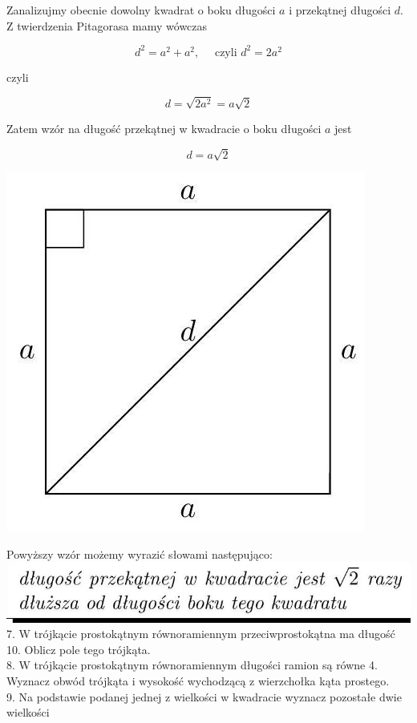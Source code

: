 \documentclass[10pt]{article}
\begin{document}
Zanalizujmy obecnie dowolny kwadrat o boku długości \(a\) i przekątnej długości \(d\). Z twierdzenia Pitagorasa mamy wówczas

\[
d^{2}=a^{2}+a^{2}, \quad \text { czyli } d^{2}=2 a^{2}
\]

czyli

\[
d=\sqrt{2 a^{2}}=a \sqrt{2}
\]

Zatem wzór na długość przekątnej w kwadracie o boku długości \(a\) jest

\[
d=a \sqrt{2}
\]

\begin{center}
\includegraphics[max width=\textwidth]{2024_11_21_71f62bd117d375398909g-124}
\end{center}

Powyższy wzór możemy wyrazić słowami następująco:\\
\includegraphics[max width=\textwidth, center]{2024_11_21_71f62bd117d375398909g-124(1)}\\
7. W trójkącie prostokątnym równoramiennym przeciwprostokątna ma długość 10. Oblicz pole tego trójkąta.\\
8. W trójkącie prostokątnym równoramiennym długości ramion są równe 4. Wyznacz obwód trójkąta i wysokość wychodzącą z wierzchołka kąta prostego.\\
9. Na podstawie podanej jednej z wielkości w kwadracie wyznacz pozostałe dwie wielkości
\end{document}

